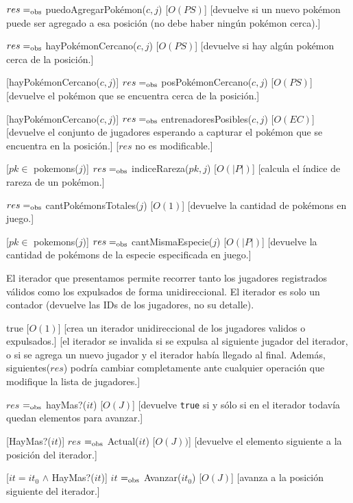 \begin{Interfaz}
	{$res =_{\mathrm{obs}}$ puedoAgregarPokémon($c,j$)}
	[$O(PS)$]
	[devuelve si un nuevo pokémon puede ser agregado a esa posición (no debe haber ningún pokémon cerca).]

	{$res =_{\mathrm{obs}}$ hayPokémonCercano($c,j$)}
	[$O(PS)$]
	[devuelve si hay algún pokémon cerca de la posición.]

	[hayPokémonCercano($c,j$)]
	{$res =_{\mathrm{obs}}$ posPokémonCercano($c,j$)}
	[$O(PS)$]
	[devuelve el pokémon que se encuentra cerca de la posición.]

	[hayPokémonCercano($c,j$)]
	{$res =_{\mathrm{obs}}$ entrenadoresPosibles($c,j$)}
	[$O(EC)$]
	[devuelve el conjunto de jugadores esperando a capturar el pokémon que se encuentra en la posición.]
	[$res$ no es modificable.]

	[$pk \in$ pokemons($j$)]
	{$res =_{\mathrm{obs}}$ indiceRareza($pk,j$)}
	[$O(|P|)$]
	[calcula el índice de rareza de un pokémon.]

	{$res =_{\mathrm{obs}}$ cantPokémonsTotales($j$)}
	[$O(1)$]
	[devuelve la cantidad de pokémons en juego.]

	[$pk \in$ pokemons($j$)]
	{$res =_{\mathrm{obs}}$ cantMismaEspecie($j$)}
	[$O(|P|)$]
	[devuelve la cantidad de pokémons de la especie especificada en juego.]


	El iterador que presentamos permite recorrer tanto los jugadores registrados válidos como los expulsados de forma unidireccional. El iterador es solo un contador (devuelve las IDs de los jugadores, no su detalle).


	{true}
	[$O(1)$]
	[crea un iterador unidireccional de los jugadores validos o expulsados.]
	[el iterador se invalida si se expulsa al siguiente jugador del iterador, o si se agrega un nuevo jugador y el iterador había llegado al final. Además, siguientes($res$) podría cambiar completamente ante cualquier operación que modifique la lista de jugadores.]

	{$res$ $=_{\mathrm{obs}}$ hayMas?($it$)}
	[$O(J)$]
	[devuelve \texttt{true} si y sólo si en el iterador todavía quedan elementos para avanzar.]

	[HayMas?($it$)]
	{$res$ $=_{\mathrm{obs}}$ Actual($it$)}
	[$O(J))$]
	[devuelve el elemento siguiente a la posición del iterador.]

	[$it = it_0$ $\land$ HayMas?($it$)]
	{$it$ $=_{\mathrm{obs}}$ Avanzar($it_0$)}
	[$O(J)$]
	[avanza a la posición siguiente del iterador.]
\end{Interfaz}

